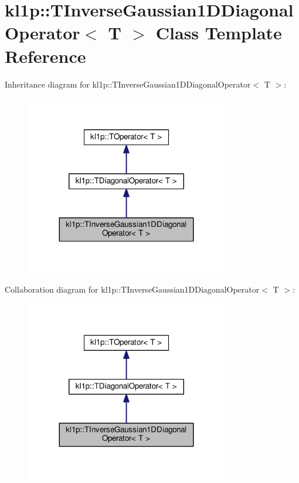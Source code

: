 \hypertarget{classkl1p_1_1TInverseGaussian1DDiagonalOperator}{}\section{kl1p\+:\+:T\+Inverse\+Gaussian1\+D\+Diagonal\+Operator$<$ T $>$ Class Template Reference}
\label{classkl1p_1_1TInverseGaussian1DDiagonalOperator}


Inheritance diagram for kl1p\+:\+:T\+Inverse\+Gaussian1\+D\+Diagonal\+Operator$<$ T $>$\+:
\nopagebreak
\begin{figure}[H]
\begin{center}
\leavevmode
\includegraphics[width=251pt]{classkl1p_1_1TInverseGaussian1DDiagonalOperator__inherit__graph}
\end{center}
\end{figure}


Collaboration diagram for kl1p\+:\+:T\+Inverse\+Gaussian1\+D\+Diagonal\+Operator$<$ T $>$\+:
\nopagebreak
\begin{figure}[H]
\begin{center}
\leavevmode
\includegraphics[width=251pt]{classkl1p_1_1TInverseGaussian1DDiagonalOperator__coll__graph}
\end{center}
\end{figure}
